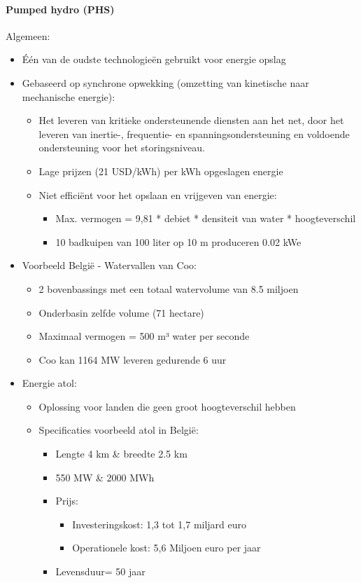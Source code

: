 \documentclass[12pt]{article}
\begin{document}
\paragraph{Pumped hydro (PHS)}
Algemeen:\begin{itemize}
    \item Één van de oudste technologieën gebruikt voor energie opslag
    \item Gebaseerd op synchrone opwekking
    (omzetting van kinetische naar mechanische energie):\begin{itemize}
        \item Het leveren van kritieke ondersteunende diensten aan het net, door het
        leveren van inertie-, frequentie- en spanningsondersteuning en voldoende
        ondersteuning voor het storingsniveau.
        \item Lage prijzen (21 USD/kWh) per kWh opgeslagen energie 
        \item Niet efficiënt voor het opslaan en vrijgeven van energie:\begin{itemize}
            \item Max. vermogen = 9,81 * debiet * densiteit van water * hoogteverschil
            \item 10 badkuipen van 100 liter op 10 m produceren 0.02 kWe
        \end{itemize}
    \end{itemize}
    \item Voorbeeld België - Watervallen van Coo:\begin{itemize}
        \item 2 bovenbassings met een totaal watervolume van 8.5 miljoen
        \item Onderbasin zelfde volume (71 hectare)
        \item Maximaal vermogen = 500 m³ water per seconde
        \item Coo kan 1164 MW leveren gedurende 6 uur
    \end{itemize}
    \item Energie atol:\begin{itemize}
        \item Oplossing voor landen die geen groot hoogteverschil hebben
        \item Specificaties voorbeeld atol in België:\begin{itemize}
            \item Lengte 4 km \& breedte 2.5 km
            \item 550 MW \& 2000 MWh
            \item Prijs:\begin{itemize}
                \item Investeringskost: 1,3 tot 1,7 miljard euro
                \item Operationele kost: 5,6 Miljoen euro per jaar
            \end{itemize}
            \item Levensduur= 50 jaar
        \end{itemize}
    \end{itemize}
\end{itemize}
\end{document}
